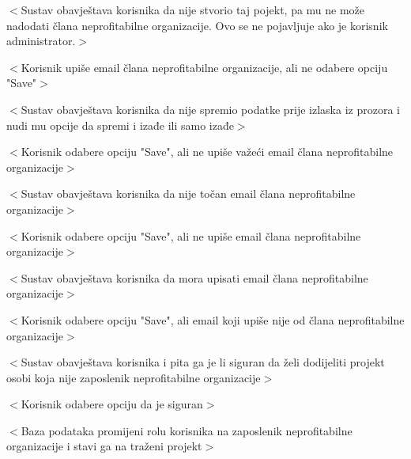 \begin{packed_item}
\begin{packed_item}
\begin{packed_enum}
								\item $<$Sustav obavještava korisnika da nije stvorio taj pojekt, pa mu ne može nadodati člana neprofitabilne organizacije. Ovo se ne pojavljuje ako je korisnik administrator.$>$

							\end{packed_enum}

							\item[9.a] $<$Korisnik upiše email člana neprofitabilne organizacije, ali ne odabere opciju "Save"$>$
							\item[] \begin{packed_enum}

								\item $<$Sustav obavještava korisnika da nije spremio podatke prije izlaska
								iz prozora i nudi mu opcije da spremi i izađe ili samo izađe$>$

							\end{packed_enum}

							\item[9.b] $<$Korisnik odabere opciju "Save", ali ne upiše važeći email člana neprofitabilne organizacije$>$
							\item[] \begin{packed_enum}

								\item $<$Sustav obavještava korisnika da nije točan email člana neprofitabilne organizacije$>$

							\end{packed_enum}

							\item[9.c] $<$Korisnik odabere opciju "Save", ali ne upiše email člana neprofitabilne organizacije$>$
							\item[] \begin{packed_enum}

								\item $<$Sustav obavještava korisnika da mora upisati email člana neprofitabilne organizacije$>$

							\end{packed_enum}

							\item[9.d] $<$Korisnik odabere opciju "Save", ali email koji upiše nije od člana neprofitabilne organizacije$>$
							\item[] \begin{packed_enum}

								\item $<$Sustav obavještava korisnika i pita ga je li siguran da želi dodijeliti projekt
								osobi koja nije zaposlenik neprofitabilne organizacije$>$
								\item $<$Korisnik odabere opciju da je siguran$>$
								\item $<$Baza podataka promijeni rolu korisnika na zaposlenik neprofitabilne organizacije
								i stavi ga na traženi projekt$>$

							\end{packed_enum}

						\end{packed_item}
					\end{packed_item}

